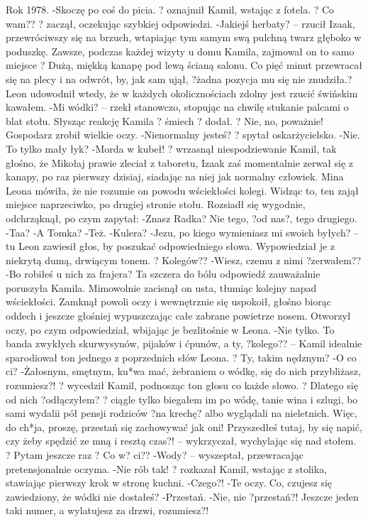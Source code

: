 \documentclass[../MAIN.tex]{subfiles}
\begin{document}
Rok 1978.
-Skoczę po coś do picia. ? oznajmił Kamil, wstając z fotela. ? Co wam?? ? zaczął, oczekując szybkiej odpowiedzi.
-Jakiejś herbaty? -- rzucił Izaak, przewróciwszy się na brzuch, wtapiając tym samym swą pulchną twarz głęboko w poduszkę. Zawsze, podczas każdej wizyty u domu Kamila, zajmował on to samo miejsce ? Dużą, miękką kanapę pod lewą ścianą salonu. Co pięć minut przewracał się na plecy i na odwrót, by, jak sam ujął, ?żadna pozycja mu się nie znudziła.?
Leon udowodnił wtedy, że w każdych okolicznościach zdolny jest rzucić świńskim kawałem.
-Mi wódki? -- rzekł stanowczo, stopując na chwilę stukanie palcami o blat stołu. Słysząc reakcję Kamila ? śmiech ? dodał. ? Nie, no, poważnie!
Gospodarz zrobił wielkie oczy.
-Nienormalny jesteś? ? spytał oskarżycielsko.
-Nie. To tylko mały łyk?
-Morda w kubeł! ? wrzasnął niespodziewanie Kamil, tak głośno, że Mikołaj prawie zleciał z taboretu, Izaak zaś momentalnie zerwał się z kanapy, po raz pierwszy dzisiaj, siadając na niej jak normalny człowiek.
Mina Leona mówiła, że nie rozumie on powodu wściekłości kolegi. Widząc to, ten zajął miejsce naprzeciwko, po drugiej stronie stołu. Rozsiadł się wygodnie, odchrząknął, po czym zapytał:
-Znasz Radka? Nie tego, ?od nas?, tego drugiego.
-Taa?
-A Tomka?
-Też.
-Kulera?
-Jezu, po kiego wymieniasz mi swoich byłych? -- tu Leon zawiesił głos, by poszukać odpowiedniego słowa. Wypowiedział je z niekrytą dumą, drwiącym tonem. ? Kolegów??
-Wiesz, czemu z nimi ?zerwałem??
-Bo robiłeś u nich za frajera?
Ta szczera do bólu odpowiedź zauważalnie poruszyła Kamila. Mimowolnie zacisnął on usta, tłumiąc kolejny napad wściekłości. Zamknął powoli oczy i wewnętrznie się uspokoił, głośno biorąc oddech i jeszcze głośniej wypuszczając całe zabrane powietrze nosem. Otworzył oczy, po czym odpowiedział, wbijając je bezlitośnie w Leona.
-Nie tylko. To banda zwykłych skurwysynów, pijaków i ćpunów, a ty, ?kolego?? -- Kamil idealnie sparodiował ton jednego z poprzednich słów Leona. ? Ty, takim nędznym?
-O co ci?
-Żałosnym, smętnym, ku*wa mać, żebraniem o wódkę, się do nich przybliżasz, rozumiesz?! ? wycedził Kamil, podnosząc ton głosu co każde słowo. ? Dlatego się od nich ?odłączyłem? ? ciągle tylko biegałem im po wódę, tanie wina i szlugi, bo sami wydalii pół pensji rodziców ?na krechę? albo wyglądali na nieletnich. Więc, do ch*ja, proszę, przestań się zachowywać jak oni! Przyszedłeś tutaj, by się napić, czy żeby spędzić ze mną i resztą czas?! -- wykrzyczał, wychylając się nad stołem. ? Pytam jeszcze raz ? Co w? ci??
-Wody? -- wyszeptał, przewracając pretensjonalnie oczyma.
-Nie rób tak! ? rozkazał Kamil, wstając z stolika, stawiając pierwszy krok w stronę kuchni.
-Czego?!
-Te oczy. Co, czujesz się zawiedziony, że wódki nie dostałeś?
-Przestań.
-Nie, nie ?przestań?! Jeszcze jeden taki numer, a wylatujesz za drzwi, rozumiesz?!
\end{document}
